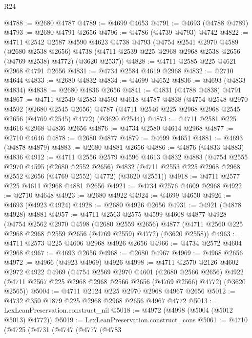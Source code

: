 \begin{lexlean}{R24}
\begin{coremodule}
@4788 := @2680 @4787
@4789 := @4699 @4653
@4791 := @4693 (@4788 @4789)
@4793 := @2680 @4791 @2656
@4796 := @4786 (@4739 @4793) @4742
@4822 := @4711
    @2542
    @2587
    @4590
    @4623
    @4738
    @4793
    (@4754
      @2541
      @2970
      @4589
      (@2680 @2538 @2656)
      @4738
      (@4711 @2539 @225 @2968 @2968 @2538 @2656 (@4769 @2538) @4772)
      (@3620 @2537))
@4828 := @4711 @2585 @225 @4621 @2968 @4791 @2656
@4831 := @4734 @2584 @4619 @2968
@4832 := @2710 @4644
@4833 := @2680 @4832
@4834 := @4699 @4652
@4836 := @4693 (@4833 @4834)
@4838 := @2680 @4836 @2656
@4841 := @4831 (@4788 @4838) @4791
@4867 := @4711
    @2549
    @2583
    @4593
    @4618
    @4787
    @4838
    (@4754
      @2548
      @2970
      @4592
      (@2680 @2545 @2656)
      @4787
      (@4711 @2546 @225 @2968 @2968 @2545 @2656 (@4769 @2545) @4772)
      (@3620 @2544))
@4873 := @4711 @2581 @225 @4616 @2968 @4836 @2656
@4876 := @4734 @2580 @4614 @2968
@4877 := @2710 @4646
@4878 := @2680 @4877
@4879 := @4699 @4651
@4881 := @4693 (@4878 @4879)
@4883 := @2680 @4881 @2656
@4886 := @4876 (@4833 @4883) @4836
@4912 := @4711
    @2556
    @2579
    @4596
    @4613
    @4832
    @4883
    (@4754
      @2555
      @2970
      @4595
      (@2680 @2552 @2656)
      @4832
      (@4711 @2553 @225 @2968 @2968 @2552 @2656 (@4769 @2552) @4772)
      (@3620 @2551))
@4918 := @4711 @2577 @225 @4611 @2968 @4881 @2656
@4921 := @4734 @2576 @4609 @2968
@4922 := @2710 @4648
@4923 := @2680 @4922
@4924 := @4699 @4650
@4926 := @4693 (@4923 @4924)
@4928 := @2680 @4926 @2656
@4931 := @4921 (@4878 @4928) @4881
@4957 := @4711
    @2563
    @2575
    @4599
    @4608
    @4877
    @4928
    (@4754
      @2562
      @2970
      @4598
      (@2680 @2559 @2656)
      @4877
      (@4711 @2560 @225 @2968 @2968 @2559 @2656 (@4769 @2559) @4772)
      (@3620 @2558))
@4963 := @4711 @2573 @225 @4606 @2968 @4926 @2656
@4966 := @4734 @2572 @4604 @2968
@4967 := @4693 @2656
@4968 := @2680 @4967
@4969 := @4968 @2656
@4972 := @4966 (@4923 @4969) @4926
@4998 := @4711
    @2570
    @2126
    @4602
    @2972
    @4922
    @4969
    (@4754
      @2569
      @2970
      @4601
      (@2680 @2566 @2656)
      @4922
      (@4711 @2567 @225 @2968 @2968 @2566 @2656 (@4769 @2566) @4772)
      (@3620 @2565))
@5004 := @4711 @2124 @225 @2970 @2968 @4967 @2656
@5012 := @4732 @350 @1879 @225 @2968 @2968 @2656 @4967 @4772
@5013 := LexLeanPreservation.construct_nil
@5018 := @4972 (@4998 (@5004 (@5012 @5013) @4772))
@5019 := LexLeanPreservation.construct_cons
@5061 := @4710
    (@4725
      (@4731
        (@4747
          (@4777
            (@4783

\end{coremodule}
\end{lexlean}
